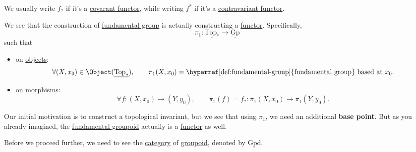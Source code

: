 \begin{remark}
	We usually write \(f_\ast\) if it's a \hyperref[def:functor]{covarant functor}, while writing \(f^\ast\)
	if it's a \hyperref[def:contravariant-functor]{contravariant functor}.
\end{remark}
\begin{remark}
	We see that the construction of \hyperref[def:fundamental-group]{fundamental group} is actually constructing a \hyperref[def:functor]{functor}. Specifically,
	\[
		\pi _1\colon \underline{\mathrm{Top}_*} \to \underline{\mathrm{Gp}}
	\]
	such that
	\begin{itemize}
		\item on \hyperref[def:object]{objects}:
		      \[
			      \forall (X, x_{0} )\in \Object (\underline{\mathrm{Top}_*}),\qquad \pi _1(X, x_0) = \text{\hyperref[def:fundamental-group]{fundamental group} based at \(x_0\)}.
		      \]
		\item on \hyperref[def:morphism]{morphisms}:
		      \[
			      \forall f\colon (X, x_0)\to (Y, y_0),\qquad \pi _1(f) = f_\ast \colon \pi _1(X, x_0)\to \pi _1(Y, y_0).
		      \]
	\end{itemize}
\end{remark}

Our initial motivation is to construct a topological invariant, but we see that using \(\pi _1\), we need an additional \textbf{base point}. But as you already
imagined, the \hyperref[def:fundamental-groupoid]{fundamental groupoid} actually is a \hyperref[def:functor]{functor} as well.

Before we proceed further, we need to see the \hyperref[def:category]{category} of \hyperref[def:groupoid]{groupoid}, denoted by \(\underline{\mathrm{Gpd}}\).

